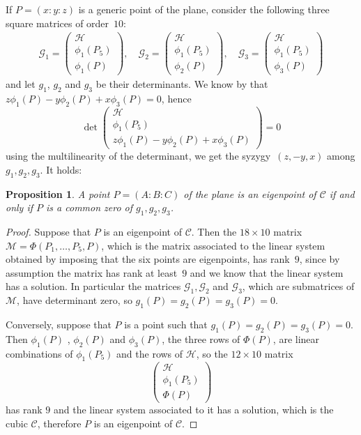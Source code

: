 \documentclass[12pt, a4paper, reqno, captions=tableheading,bibliography=totoc]{scrartcl}
\theoremstyle{plain}
\newtheorem{prop}[lemma]{Proposition}
\theoremstyle{definition}
\begin{document}
If $P = (x: y: z)$ is a generic point of the plane,
consider the following three square matrices of order~$10$:
%
\begin{eqnarray}
\label{G1G2G3}
\mathcal{G}_1 =
\left(
\begin{array}{c}
  \mathcal{H} \\
  \phi_1(P_5)\\
  \phi_1(P)
\end{array}
\right),
\quad
\mathcal{G}_2 =
\left(
\begin{array}{c}
  \mathcal{H} \\
  \phi_1(P_5)\\
  \phi_2(P)
\end{array}
\right),
\quad
\mathcal{G}_3 =
\left(
\begin{array}{c}
  \mathcal{H} \\
  \phi_1(P_5)\\
  \phi_3(P)
\end{array}
\right)
\end{eqnarray}
and let $g_1$, $g_2$ and $g_3$ be their determinants.
We know by  that $z \phi_1(P)-y\phi_2(P) +x\phi_3(P) = 0$, hence
%
\[
\det
\left(
\begin{array}{c}
  \mathcal{H} \\
  \phi_1(P_5)\\
  z \phi_1(P)-y\phi_2(P) +x\phi_3(P)
\end{array}
\right) = 0
\]
%
using the multilinearity of the determinant, we get the syzygy~$(z,-y,x)$ among
$g_1, g_2, g_3$.
It holds:
\begin{prop}
 \label{threeG}
  A point $P = (A: B: C)$ of the plane is an eigenpoint of $\mathcal{C}$ if and only if
  $P$ is a common zero of $g_1, g_2, g_3$.
\end{prop}
\begin{proof}
  Suppose that $P$ is an eigenpoint of $\mathcal{C}$. Then the $18\times 10$ matrix
  $\mathcal{M} = \Phi(P_1, \dots, P_5, P)$, which is the matrix
  associated to the linear
  system obtained by imposing that the six points are eigenpoints,
  has rank~$9$, since by assumption the matrix has rank at least~$9$ and we know that the linear system has a solution.
  In particular the matrices
  $\mathcal{G}_1, \mathcal{G}_2$ and $\mathcal{G}_3$, which are
  submatrices of $\mathcal{M}$, have determinant zero, so
  $g_1(P) = g_2(P) = g_3(P) = 0$.

  Conversely, suppose that $P$ is a point such that
  $g_1(P) = g_2(P) = g_3(P) = 0$. Then $\phi_1(P)$ , $\phi_2(P)$ and
  $\phi_3(P)$, the three rows of $\Phi(P)$, are linear combinations of
$\phi_1(P_5)$ and the rows of $\mathcal{H}$, so the $12\times 10$ matrix
  \[
\left(
\begin{array}{c}
  \mathcal{H} \\
  \phi_1(P_5)\\
  \Phi(P)
\end{array}
\right)
\]
%
has rank $9$ and the linear system associated to it has a solution,
which is the cubic $\mathcal{C}$, therefore $P$ is an eigenpoint of $\mathcal{C}$.
\end{proof}
\end{document}
